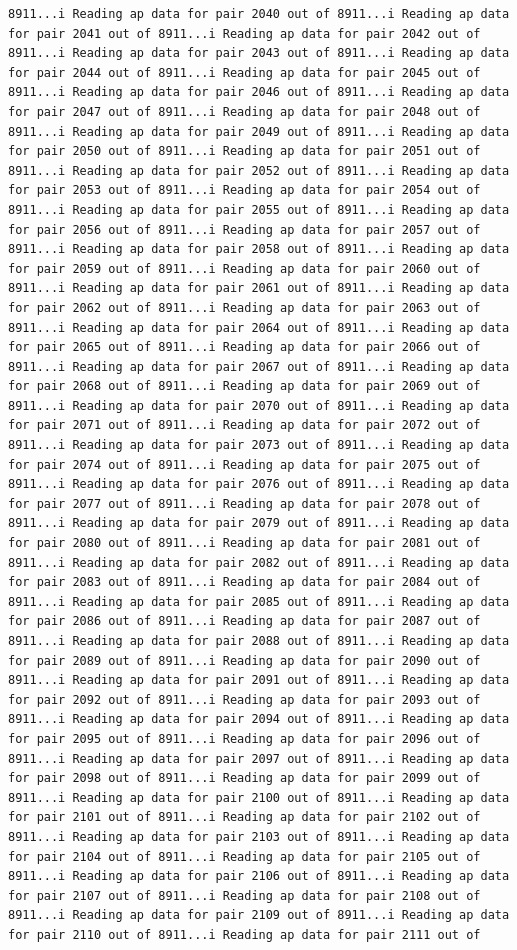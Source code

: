 \documentclass[
]{article}
\begin{document}
\begin{verbatim}
8911...i Reading ap data for pair 2040 out of 8911...i Reading ap data for pair 2041 out of 8911...i Reading ap data for pair 2042 out of 8911...i Reading ap data for pair 2043 out of 8911...i Reading ap data for pair 2044 out of 8911...i Reading ap data for pair 2045 out of 8911...i Reading ap data for pair 2046 out of 8911...i Reading ap data for pair 2047 out of 8911...i Reading ap data for pair 2048 out of 8911...i Reading ap data for pair 2049 out of 8911...i Reading ap data for pair 2050 out of 8911...i Reading ap data for pair 2051 out of 8911...i Reading ap data for pair 2052 out of 8911...i Reading ap data for pair 2053 out of 8911...i Reading ap data for pair 2054 out of 8911...i Reading ap data for pair 2055 out of 8911...i Reading ap data for pair 2056 out of 8911...i Reading ap data for pair 2057 out of 8911...i Reading ap data for pair 2058 out of 8911...i Reading ap data for pair 2059 out of 8911...i Reading ap data for pair 2060 out of 8911...i Reading ap data for pair 2061 out of 8911...i Reading ap data for pair 2062 out of 8911...i Reading ap data for pair 2063 out of 8911...i Reading ap data for pair 2064 out of 8911...i Reading ap data for pair 2065 out of 8911...i Reading ap data for pair 2066 out of 8911...i Reading ap data for pair 2067 out of 8911...i Reading ap data for pair 2068 out of 8911...i Reading ap data for pair 2069 out of 8911...i Reading ap data for pair 2070 out of 8911...i Reading ap data for pair 2071 out of 8911...i Reading ap data for pair 2072 out of 8911...i Reading ap data for pair 2073 out of 8911...i Reading ap data for pair 2074 out of 8911...i Reading ap data for pair 2075 out of 8911...i Reading ap data for pair 2076 out of 8911...i Reading ap data for pair 2077 out of 8911...i Reading ap data for pair 2078 out of 8911...i Reading ap data for pair 2079 out of 8911...i Reading ap data for pair 2080 out of 8911...i Reading ap data for pair 2081 out of 8911...i Reading ap data for pair 2082 out of 8911...i Reading ap data for pair 2083 out of 8911...i Reading ap data for pair 2084 out of 8911...i Reading ap data for pair 2085 out of 8911...i Reading ap data for pair 2086 out of 8911...i Reading ap data for pair 2087 out of 8911...i Reading ap data for pair 2088 out of 8911...i Reading ap data for pair 2089 out of 8911...i Reading ap data for pair 2090 out of 8911...i Reading ap data for pair 2091 out of 8911...i Reading ap data for pair 2092 out of 8911...i Reading ap data for pair 2093 out of 8911...i Reading ap data for pair 2094 out of 8911...i Reading ap data for pair 2095 out of 8911...i Reading ap data for pair 2096 out of 8911...i Reading ap data for pair 2097 out of 8911...i Reading ap data for pair 2098 out of 8911...i Reading ap data for pair 2099 out of 8911...i Reading ap data for pair 2100 out of 8911...i Reading ap data for pair 2101 out of 8911...i Reading ap data for pair 2102 out of 8911...i Reading ap data for pair 2103 out of 8911...i Reading ap data for pair 2104 out of 8911...i Reading ap data for pair 2105 out of 8911...i Reading ap data for pair 2106 out of 8911...i Reading ap data for pair 2107 out of 8911...i Reading ap data for pair 2108 out of 8911...i Reading ap data for pair 2109 out of 8911...i Reading ap data for pair 2110 out of 8911...i Reading ap data for pair 2111 out of 
\end{verbatim}
\end{document}
